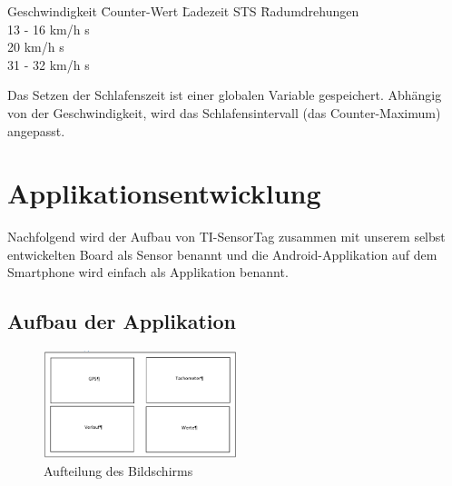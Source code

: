 \begin{minipage}{\textwidth}
    \begin{tabbing}
   Geschwindigkeit \quad\= Counter-Wert  \quad\= Ladezeit STS    \quad\= Radumdrehungen\\[0.8ex]
   13 - 16 km/h                          s    \\
   20 km/h                                s    \\
   31 - 32 km/h                           s    \\    
    \end{tabbing}
\end{minipage}

Das Setzen der Schlafenszeit ist einer globalen Variable gespeichert. Abhängig von der Geschwindigkeit, wird das Schlafensintervall (das Counter-Maximum) angepasst.






\section{Applikationsentwicklung}

Nachfolgend wird der Aufbau von TI-SensorTag zusammen mit unserem selbst entwickelten Board als Sensor benannt und die Android-Applikation auf dem Smartphone wird einfach als Applikation benannt.

\subsection{Aufbau der Applikation}

\begin{figure}[ht]
    \includegraphics[width=0.5\textwidth]{3Vorgehen/imag/Aufbau_Applikation_erste_Version.png}
    \caption{Aufteilung des Bildschirms}\label{aufbau_applikation_1} 
\end{figure}

